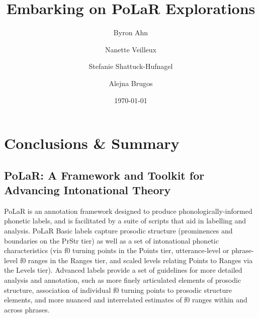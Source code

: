 \documentclass[11pt, twoside]{memoir}
\def\THIStitle{Embarking on PoLaR Explorations}
\def\THISsubtitle{A Framework for Intonational Annotation and Analysis}
\begin{document}
\frontmatter
{}

\title{\THIStitle}
\author{Byron Ahn \and Nanette Veilleux \and Stefanie Shattuck-Hufnagel \and Alejna Brugos}
\date{\today}


\tableofcontents
\newpage
\listoffigures
\listoftables
\newpage

\mainmatter
\chapter{Conclusions \& Summary}
\section*{PoLaR: A Framework and Toolkit for Advancing Intonational Theory}
PoLaR is an annotation framework designed to produce phonologically-informed phonetic labels, and is facilitated by a suite of scripts that aid in labelling and analysis. PoLaR Basic labels capture prosodic structure (prominences and boundaries on the PrStr tier) as well as a set of intonational phonetic characteristics (via f0 turning points in the Points tier, utterance-level or phrase-level f0 ranges in the Ranges tier, and scaled levels relating Points to Ranges via the Levels tier). Advanced labels provide a set of guidelines for more detailed analysis and annotation, such as more finely articulated elements of prosodic structure, association of individual f0 turning points to prosodic structure elements, and more nuanced and interrelated estimates of f0 ranges within and across phrases.
\end{document}

